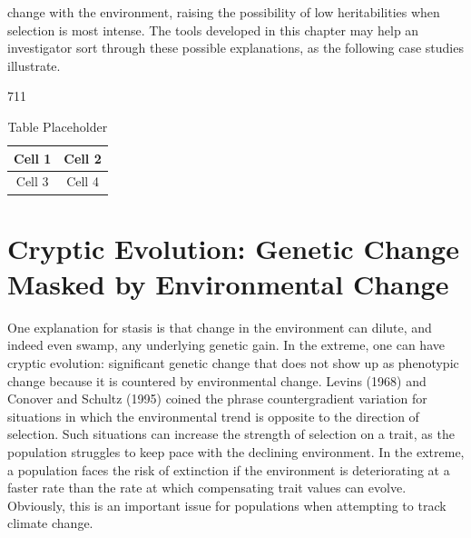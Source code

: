 \documentclass{article}
\begin{document}
change with the environment, raising the possibility of low heritabilities when selection is most intense. The tools developed in this chapter may help an investigator sort through these possible explanations, as the following case studies illustrate.

711

\begin{table}[h]
\centering
\begin{tabular}{|c|c|}
\hline
Cell 1 & Cell 2 \\
\hline
Cell 3 & Cell 4 \\
\hline
\end{tabular}
\caption{Table Placeholder}
\end{table}

\section{Cryptic Evolution: Genetic Change Masked by Environmental Change}
One explanation for stasis is that change in the environment can dilute, and indeed even swamp, any underlying genetic gain. In the extreme, one can have cryptic evolution: significant genetic change that does not show up as phenotypic change because it is countered by environmental change. Levins (1968) and Conover and Schultz (1995) coined the phrase countergradient variation for situations in which the environmental trend is opposite to the direction of selection. Such situations can increase the strength of selection on a trait, as the population struggles to keep pace with the declining environment. In the extreme, a population faces the risk of extinction if the environment is deteriorating at a faster rate than the rate at which compensating trait values can evolve. Obviously, this is an important issue for populations when attempting to track climate change.
\end{document}
